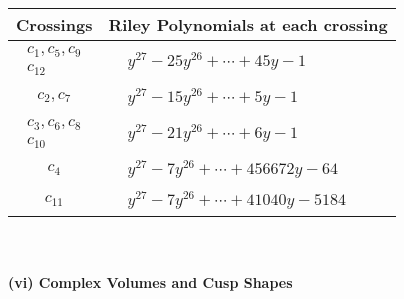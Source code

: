 \documentclass[1p]{elsarticle_modified}
\theoremstyle{definition}
\begin{document}
\begin{tabular}{m{50pt}|m{274pt}}
Crossings & \hspace{64pt}Riley Polynomials at each crossing \\
\hline $$\begin{aligned}c_{1},c_{5},c_{9}\\c_{12}\end{aligned}$$&$\begin{aligned}
&y^{27}-25 y^{26}+\cdots+45 y-1
\end{aligned}$\\
\hline $$\begin{aligned}c_{2},c_{7}\end{aligned}$$&$\begin{aligned}
&y^{27}-15 y^{26}+\cdots+5 y-1
\end{aligned}$\\
\hline $$\begin{aligned}c_{3},c_{6},c_{8}\\c_{10}\end{aligned}$$&$\begin{aligned}
&y^{27}-21 y^{26}+\cdots+6 y-1
\end{aligned}$\\
\hline $$\begin{aligned}c_{4}\end{aligned}$$&$\begin{aligned}
&y^{27}-7 y^{26}+\cdots+456672 y-64
\end{aligned}$\\
\hline $$\begin{aligned}c_{11}\end{aligned}$$&$\begin{aligned}
&y^{27}-7 y^{26}+\cdots+41040 y-5184
\end{aligned}$\\
\hline
\end{tabular}\\~\\
\newpage\flushleft \textbf{(vi) Complex Volumes and Cusp Shapes}
\end{document}
